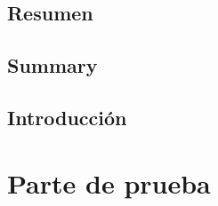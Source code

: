 \documentclass[
  a4paper,
  12pt,
  spanish,
  dvipsnames,
  footinclude,
  headinclude,
]{scrbook}
\theoremstyle{theorem-style}
\theoremstyle{definition-style}
\begin{document}
\chapter*{Resumen}

\blindtext[2]

\chapter*{Summary}

\blindtext[6]

\chapter*{Introducción}



\part{Parte de prueba}






\newpage
\printbibliography
\end{document}
